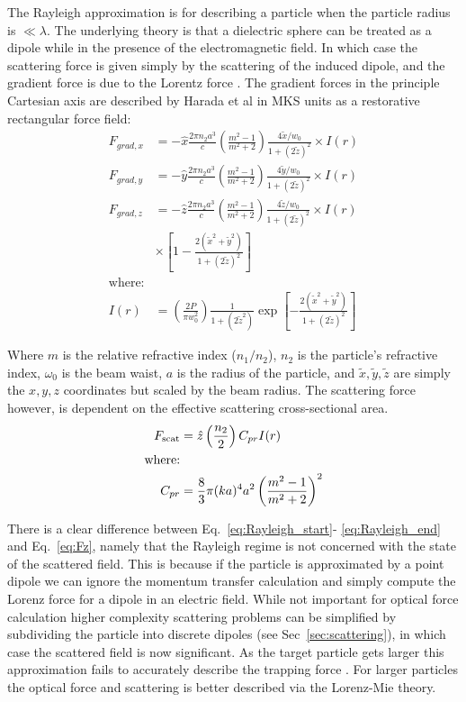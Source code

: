 The Rayleigh approximation is for describing a particle when 
the particle radius is $\ll \lambda$. The underlying theory 
is that a dielectric sphere can be treated as a dipole while 
in the presence of the electromagnetic field. In which case 
the scattering force is given simply by the scattering of 
the induced dipole, and the gradient force is due to the 
Lorentz force \cite{Gordon1973}. The gradient forces in the 
principle Cartesian axis are described by Harada et al \cite{YasuhiroHarada1996} in MKS units as a restorative 
rectangular force field:
\begin{align}
  F_{grad,x}
  &=-\hat{x} \frac{2\pi n_2 a^3}{c}
    \left(\frac{m^2-1}{m^2+2}\right) \frac{4\tilde{x}/w_0}{1+(2\tilde{z})^2} \times I(r)
  \label{eq:Rayleigh_start}\\
  F_{grad,y}
  &=-\hat{y} \frac{2\pi n_2 a^3}{c}
    \left(\frac{m^2-1}{m^2+2}\right) \frac{4\tilde{y}/w_0}{1+(2\tilde{z})^2} \times I(r)
  \\
  F_{grad,z}
  &=-\hat{z} \frac{2\pi n_2 a^3}{c}
    \left(\frac{m^2-1}{m^2+2}\right) \frac{4\tilde{z}/w_0}{1+(2\tilde{z})^2}
    \nonumber \times I(r)
  \\ 
  & \times \left[1-\frac{2(\tilde{x}^2+\tilde{y}^2)}{1+(2\tilde{z})^2} \right]
  \\
  \label{eq:Rayleigh_end}
  \text{where:}
  \nonumber
  \\
	I(r) &= \left(\frac{2P}{\pi w_0^2}\right) \frac{1}{1+(2\tilde{z}^2)} 
	\exp \left[ - \frac{2(\tilde{x}^2+\tilde{y}^2)}{1+(2\tilde{z})^2} \right]
\end{align}

\noindent
Where $m$ is the relative refractive index ($n_1/n_2$), $n_2$ is 
the particle's refractive index, $\omega_0$ is the beam waist, 
$a$ is the radius of the particle, and $\tilde{x}, \tilde{y}, 
\tilde{z}$ are simply the $x, y, z$ coordinates but scaled by the 
beam radius. The scattering force however, is dependent on the 
effective scattering cross-sectional area. 
\begin{align}
  F_{\rm scat}
  &= \hat{z} \left(\frac{n_2}{2}\right) C_{pr} I(r) \\
  \text{where:} \nonumber \\
  C_{pr} &= \frac{8}{3} \pi (ka)^4 a^2 \left(\frac{m^2-1}{m^2+2}\right)^2
\end{align}

There is a clear difference between Eq.~\eqref{eq:Rayleigh_start}-
\eqref{eq:Rayleigh_end} and Eq.~\eqref{eq:Fz}, namely that the 
Rayleigh regime is not concerned with the state of the scattered
field. This is because if the particle is approximated by a point
dipole we can ignore the momentum transfer calculation and simply
compute the Lorenz force for a dipole in an electric field. While 
not important for optical force calculation higher complexity 
scattering problems can be simplified by subdividing the particle 
into discrete dipoles (see Sec~\ref{sec:scattering}), in which case 
the scattered field is now significant. As the target particle gets 
larger this approximation fails to accurately describe the trapping force 
\cite{Li2021}. For larger particles the optical force and scattering 
is better described via the Lorenz-Mie theory. 

